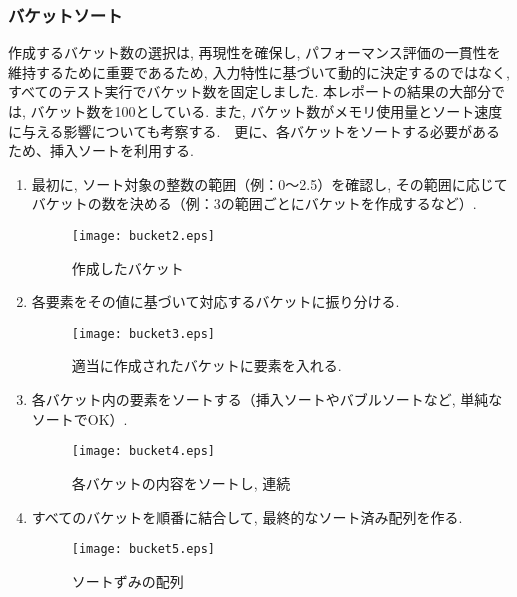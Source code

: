 \documentclass[a4j, 12pt]{jarticle}
\begin{document}
\subsubsection{バケットソート}
作成するバケット数の選択は, 再現性を確保し, パフォーマンス評価の一貫性を維持するために重要であるため, 入力特性に基づいて動的に決定するのではなく, すべてのテスト実行でバケット数を固定しました. 本レポートの結果の大部分では, バケット数を100としている. また, バケット数がメモリ使用量とソート速度に与える影響についても考察する.　更に、各バケットをソートする必要があるため、挿入ソートを利用する.\cite{gfg:bucketsort2024}\\
\begin{enumerate}
  \begin{figure}[H]
    \centering
    \texttt{[image: bucket1.eps]}
    \caption{ソート対象データ}
  \end{figure}
  \item 最初に, ソート対象の整数の範囲（例：0〜2.5）を確認し, その範囲に応じてバケットの数を決める（例：3の範囲ごとにバケットを作成するなど）. 
  \begin{figure}[H]
    \centering
    \texttt{[image: bucket2.eps]}
    \caption{作成したバケット}
  \end{figure}
  \item 各要素をその値に基づいて対応するバケットに振り分ける. 
  \begin{figure}[H]
    \centering
    \texttt{[image: bucket3.eps]}
    \caption{適当に作成されたバケットに要素を入れる. }
  \end{figure}
  \newpage
  \item 各バケット内の要素をソートする（挿入ソートやバブルソートなど, 単純なソートでOK）. 
  \begin{figure}[H]
    \centering
    \texttt{[image: bucket4.eps]}
    \caption{各バケットの内容をソートし, 連続}
  \end{figure}
  \item すべてのバケットを順番に結合して, 最終的なソート済み配列を作る. 
  \begin{figure}[H]
    \centering
    \texttt{[image: bucket5.eps]}
    \caption{ソートずみの配列}
  \end{figure}
\end{enumerate}
\end{document}
